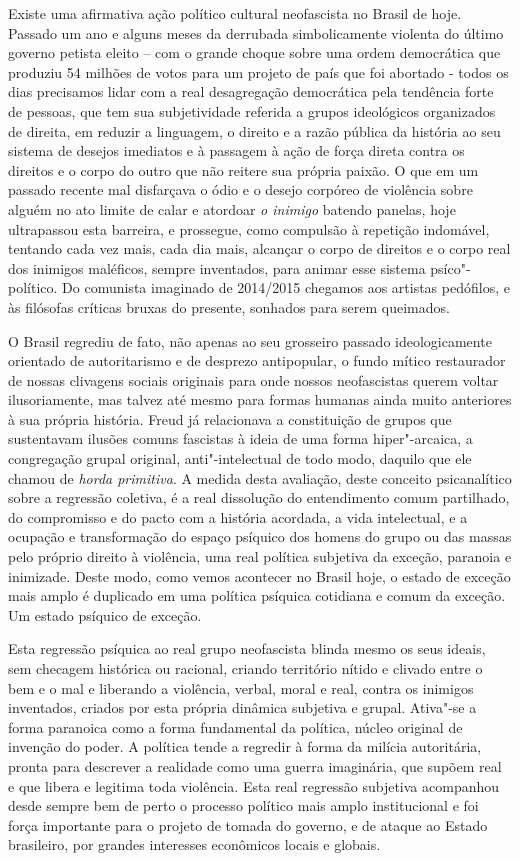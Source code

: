 Existe uma afirmativa ação político cultural neofascista no Brasil de
hoje. Passado um ano e alguns meses da derrubada simbolicamente violenta
do último governo petista eleito -- com o grande choque sobre uma ordem
democrática que produziu 54 milhões de votos para um projeto de país que
foi abortado - todos os dias precisamos lidar com a real desagregação
democrática pela tendência forte de pessoas, que tem sua subjetividade
referida a grupos ideológicos organizados de direita, em reduzir a
linguagem, o direito e a razão pública da história ao seu sistema de
desejos imediatos e à passagem à ação de força direta contra os direitos
e o corpo do outro que não reitere sua própria paixão. O que em um
passado recente mal disfarçava o ódio e o desejo corpóreo de violência
sobre alguém no ato limite de calar e atordoar \emph{o inimigo} batendo
panelas, hoje ultrapassou esta barreira, e prossegue, como compulsão à
repetição indomável, tentando cada vez mais, cada dia mais, alcançar o
corpo de direitos e o corpo real dos inimigos maléficos, sempre
inventados, para animar esse sistema psíco"-político. Do comunista
imaginado de 2014/2015 chegamos aos artistas pedófilos, e às filósofas
críticas bruxas do presente, sonhados para serem queimados.

O Brasil regrediu de fato, não apenas ao seu grosseiro passado
ideologicamente orientado de autoritarismo e de desprezo antipopular, o
fundo mítico restaurador de nossas clivagens sociais originais para onde
nossos neofascistas querem voltar ilusoriamente, mas talvez até mesmo
para formas humanas ainda muito anteriores à sua própria história. Freud
já relacionava a constituição de grupos que sustentavam ilusões comuns
fascistas à ideia de uma forma hiper"-arcaica, a congregação grupal
original, anti"-intelectual de todo modo, daquilo que ele chamou de
\emph{horda primitiva}. A medida desta avaliação, deste conceito
psicanalítico sobre a regressão coletiva, é a real dissolução do
entendimento comum partilhado, do compromisso e do pacto com a história
acordada, a vida intelectual, e a ocupação e transformação do espaço
psíquico dos homens do grupo ou das massas pelo próprio direito à
violência, uma real política subjetiva da exceção, paranoia e inimizade.
Deste modo, como vemos acontecer no Brasil hoje, o estado de exceção
mais amplo é duplicado em uma política psíquica cotidiana e comum da
exceção. Um estado psíquico de exceção.

Esta regressão psíquica ao real grupo neofascista blinda mesmo os seus
ideais, sem checagem histórica ou racional, criando território nítido e
clivado entre o bem e o mal e liberando a violência, verbal, moral e
real, contra os inimigos inventados, criados por esta própria dinâmica
subjetiva e grupal. Ativa"-se a forma paranoica como a forma fundamental
da política, núcleo original de invenção do poder. A política tende a
regredir à forma da milícia autoritária, pronta para descrever a
realidade como uma guerra imaginária, que supõem real e que libera e
legitima toda violência. Esta real regressão subjetiva acompanhou desde
sempre bem de perto o processo político mais amplo institucional e foi
força importante para o projeto de tomada do governo, e de ataque ao
Estado brasileiro, por grandes interesses econômicos locais e globais.

